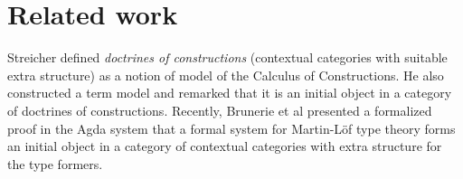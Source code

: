 \documentclass{lmcs}
\newcommand{\s}{\mathrm{s}}
\newcommand{\Ta}{\mathrm{T}}
\newcommand{\Tan}{\Ta_n}
\newcommand{\Un}{\U_n}
\begin{document}
%
%
\section{Related work}

Streicher \cite{streicher:semtt} defined {\em doctrines of constructions} (contextual categories with suitable extra structure) as a notion of model of the Calculus of Constructions. He also constructed a term model and remarked that it is an initial object in a category of doctrines of constructions.
Recently, Brunerie et al \cite{brunerie:initiality} presented a formalized proof in the Agda system that a formal system for Martin-Löf type theory forms an initial object in a category of contextual categories with extra structure for
the type formers.
\end{document}
